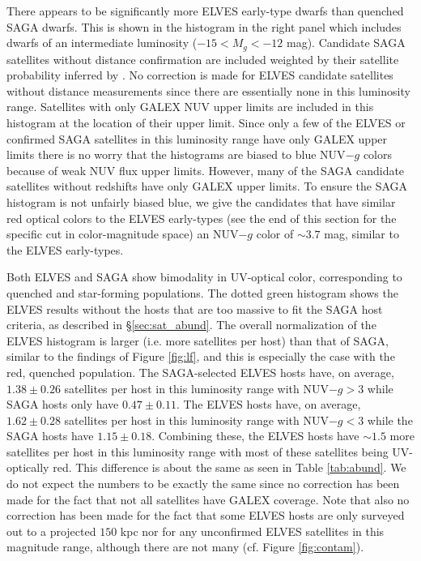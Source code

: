 \documentclass[twocolumn]{aastex62}
\begin{document}
There appears to be significantly more ELVES early-type dwarfs than quenched SAGA dwarfs. This is shown in the histogram in the right panel which includes dwarfs of an intermediate luminosity ($-15<M_g<-12$ mag). Candidate SAGA satellites without distance confirmation are included weighted by their satellite probability inferred by \citet{mao2020}. No correction is made for ELVES candidate satellites without distance measurements since there are essentially none in this luminosity range. Satellites with only GALEX NUV upper limits are included in this histogram at the location of their upper limit. Since only a few of the ELVES or confirmed SAGA satellites in this luminosity range have only GALEX upper limits there is no worry that the histograms are biased to blue NUV$-g$ colors because of weak NUV flux upper limits. However, many of the SAGA candidate satellites without redshifts have only GALEX upper limits. To ensure the SAGA histogram is not unfairly biased blue, we give the candidates that have similar red optical colors to the ELVES early-types (see the end of this section for the specific cut in color-magnitude space) an NUV$-g$ color of $\sim3.7$ mag, similar to the ELVES early-types.


Both ELVES and SAGA show bimodality in UV-optical color, corresponding to quenched and star-forming populations. The dotted green histogram shows the ELVES results without the hosts that are too massive to fit the SAGA host criteria, as described in \S\ref{sec:sat_abund}.  The overall normalization of the ELVES histogram is larger (i.e. more satellites per host) than that of SAGA, similar to the findings of Figure \ref{fig:lf}, and this is especially the case with the red, quenched population. The SAGA-selected ELVES hosts have, on average, $1.38\pm0.26$ satellites per host in this luminosity range with NUV$-g>3$ while SAGA hosts only have $0.47\pm0.11$. The ELVES hosts have, on average, $1.62\pm0.28$ satellites per host in this luminosity range with NUV$-g<3$ while the SAGA hosts have $1.15\pm0.18$. Combining these, the ELVES hosts have $\sim1.5$ more satellites per host in this luminosity range with most of these satellites being UV-optically red. This difference is about the same as seen in Table \ref{tab:abund}. We do not expect the numbers to be exactly the same since no correction has been made for the fact that not all satellites have GALEX coverage. Note that also no correction has been made for the fact that some ELVES hosts are only surveyed out to a projected $150$ kpc nor for any unconfirmed ELVES satellites in this magnitude range, although there are not many (cf. Figure \ref{fig:contam}). 
\end{document}

